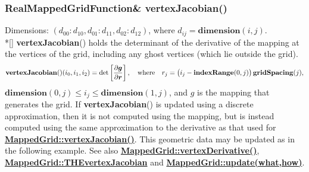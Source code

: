 \documentclass{article}
\begin{document}
  \subsubsection{RealMappedGridFunction\& vertexJacobian()}
  \label{MappedGrid::vertexJacobian()}
    Dimensions: $(d_{00}\colon d_{10},d_{01}\colon d_{11},d_{02}\colon d_{12})$, where $d_{ij} = \textbf{dimension}(i,j)$. \\*[\parskip]
    \textbf{vertexJacobian}() holds the determinant of the derivative of the mapping at the vertices of the grid,
    including any ghost vertices (which lie outside the grid).
    \[
      \textbf{vertexJacobian}()(i_0,i_1,i_2) = \det\left[{\partial\mbox{\boldmath$g$} \over \partial\mbox{\boldmath$r$}}\right],
      \quad\mbox{where}\quad
      r_j = \big(i_j - \textbf{indexRange}(0,j)\big)\,\textbf{gridSpacing}(j),
    \]
    $\textbf{dimension}(0,j) \le i_j \le \textbf{dimension}(1,j)$, and {\boldmath $g$} is the mapping that generates the grid.
    If \textbf{vertexJacobian}() is updated using a discrete approximation, then it is not computed using the mapping, but is instead
    computed using the same approximation to the derivative as that used for
    {\bf{}\hyperref{vertexJacobian()}{vertexJacobian() \rm(\S}{)}{MappedGrid::vertexJacobian()}}.
    This geometric data may be updated as in the following example.
    See also {\bf{}\hyperref{vertexDerivative()}{vertexDerivative() \rm(\S}{)}{MappedGrid::vertexDerivative()}},
    {\bf{}\hyperref{THEvertexJacobian}{THEvertexJacobian \rm(\S}{)}{MappedGrid::THEvertexJacobian}}
    and {\bf{}\hyperref{update(what,how)}{update(what,how) \rm(\S}{)}{MappedGrid::update(what,how)}}.
\end{document}
